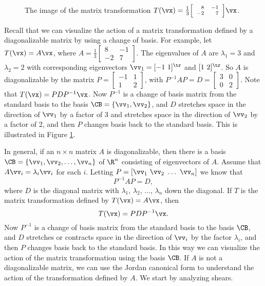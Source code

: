 
\begin{figure}[ht]
\begin{center}
\end{center}
\caption[The image of the matrix transformation.]{The image of the matrix transformation  $T(\vx) =  \frac{1}{3} {\scriptsize \left[ \begin{array}{rr} 8&-1\\-2&7 \end{array} \right] }\vx$.}
\label{F:JCF_geometry_1}
\end{figure}

Recall that we can visualize the action of a matrix transformation defined by a diagonalizable matrix by using a change of basis. For example, let $T(\vx) = A\vx$, where $A = \frac{1}{3}\left[ \begin{array}{rr} 8&-1\\-2&7 \end{array} \right]$. The eigenvalues of $A$ are $\lambda_1 = 3$ and $\lambda_2 = 2$ with corresponding eigenvectors $\vv_1 = [-1 \ 1]^{\tr}$ and $[1 \ 2]^{\tr}$. So $A$ is diagonalizable by the matrix $P = \left[ \begin{array}{rc} -1&1\\1&2 \end{array} \right]$, with $P^{-1}AP = D = \left[ \begin{array}{cc} 3&0\\0&2 \end{array} \right]$. Note that $T(\vx) = PDP^{-1} \vx$. Now $P^{-1}$ is a change of basis matrix from the standard basis to the basis $\CB = \{\vv_1, \vv_2\}$, and $D$ stretches space in the direction of $\vv_1$ by a factor of 3 and stretches space in the direction of $\vv_2$ by a factor of 2, and then $P$ changes basis back to the standard basis. This is illustrated in Figure \ref{F:JCF_geometry_1}.

In general, if an $n \times n$ matrix $A$ is diagonalizable, then there is a basis $\CB = \{\vv_1, \vv_2, \ldots, \vv_n\}$ of $\R^n$ consisting of eigenvectors of $A$. Assume that $A \vv_i = \lambda_i \vv_i$ for each $i$. Letting $P = [\vv_1 \ \vv_2 \ \ldots \ \vv_n]$ we know that 
\[P^{-1}AP = D,\]
where $D$ is the diagonal matrix with $\lambda_1$, $\lambda_2$, $\ldots$, $\lambda_n$ down the diagonal. If $T$ is the matrix transformation defined by $T(\vx) = A\vx$, then 
\[T(\vx) = PDP^{-1} \vx.\]
Now $P^{-1}$ is a change of basis matrix from the standard basis to the basis $\CB$, and $D$ stretches or contracts space in the direction of $\vv_i$ by the factor $\lambda_i$, and then $P$ changes basis back to the standard basis. In this way we can visualize the action of the matrix transformation using the basis $\CB$. If $A$ is not a diagonalizable matrix, we can use the Jordan canonical form to understand the action of the transformation defined by $A$. We start by analyzing shears.

